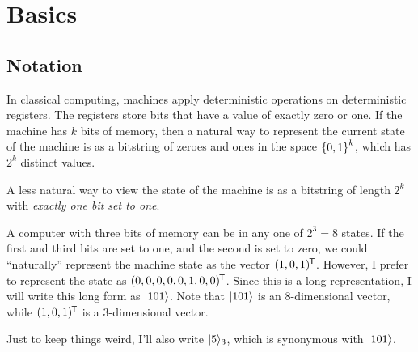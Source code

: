 \section{Basics}

\subsection{Notation}

\begin{remark}
  In classical computing, machines apply deterministic operations on
  deterministic registers. The registers store bits that have a value of
  exactly zero or one. If the machine has $k$ bits of memory, then a
  natural way to represent the current state of the machine is as a
  bitstring of zeroes and ones in the space $\left\{ 0, 1 \right\}^k$, which has
  $2^k$ distinct values.
\end{remark}

\begin{remark}
  A less natural way to view the state of the machine is as a bitstring
  of length $2^k$ with \emph{exactly one bit set to one}.
\end{remark}

\begin{example}
  A computer with three bits of memory can be in any one of $2^3 = 8$
  states. If the first and third bits are set to one, and the second is
  set to zero, we could ``naturally'' represent the machine state as the
  vector $\mathopen{}\left( {1, 0 , 1} \right)\mathclose{}^{\mkern-1.5mu\mathsf{T}}$. However, I prefer to represent the
  state as $\mathopen{}\left( {0, 0, 0, 0, 0, 1, 0, 0} \right)\mathclose{}^{\mkern-1.5mu\mathsf{T}}$. Since this is a long
  representation, I will write this long form as $|101\rangle$. Note
  that $|101\rangle$ is an 8-dimensional vector, while $\mathopen{}\left( {1, 0,
  1} \right)\mathclose{}^{\mkern-1.5mu\mathsf{T}}$ is a 3-dimensional vector.

  Just to keep things weird, I'll also write $|5\rangle_3$, which is
  synonymous with $|101\rangle$.
\end{example}

